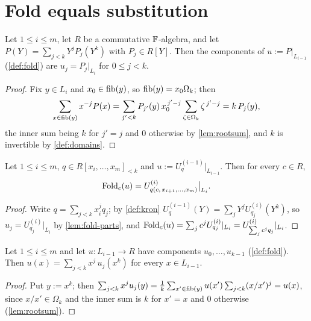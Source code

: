 \section{Fold equals substitution}

\begin{lemma}\label{lem:fold-parts}
Let $1\le i\le m$, let $R$ be a commutative $\mathbb{F}$-algebra, and let
$P(Y)=\sum_{j<k}Y^jP_j(Y^k)$ with $P_j\in R[Y]$. Then the components of $u:=P|_{L_{i-1}}$
(\cref{def:fold}) are $u_j=P_j|_{L_i}$ for $0\le j<k$.
\end{lemma}

\begin{proof}
Fix $y\in L_i$ and $x_0\in\mathrm{fib}(y)$, so $\mathrm{fib}(y)=x_0\Omega_k$; then
\[
\sum_{x\in\mathrm{fib}(y)}x^{-j}P(x)=\sum_{j'<k}P_{j'}(y)\,x_0^{\,j'-j}\sum_{\zeta\in\Omega_k}
\zeta^{\,j'-j}=k\,P_j(y),
\]
the inner sum being $k$ for $j'=j$ and $0$ otherwise by \cref{lem:rootsum}, and $k$ is invertible by
\cref{def:domains}.
\end{proof}

\begin{lemma}\label{lem:fold-sub}
Let $1\le i\le m$, $q\in R[x_i,\dots,x_m]_{<k}$ and $u:=U^{(i-1)}_q|_{L_{i-1}}$. Then for every
$c\in R$,
\[
\mathrm{Fold}_c(u)=U^{(i)}_{q(c,\,x_{i+1},\dots,x_m)}\big|_{L_i}.
\]
\end{lemma}

\begin{proof}
Write $q=\sum_{j<k}x_i^jq_j$; by \cref{def:kron} $U^{(i-1)}_q(Y)=\sum_jY^jU^{(i)}_{q_j}(Y^k)$, so
$u_j=U^{(i)}_{q_j}|_{L_i}$ by \cref{lem:fold-parts}, and
$\mathrm{Fold}_c(u)=\sum_jc^jU^{(i)}_{q_j}|_{L_i}=U^{(i)}_{\sum_jc^jq_j}|_{L_i}$.
\end{proof}

\begin{lemma}[Inversion]\label{lem:fold-invert}
Let $1\le i\le m$ and let $u:L_{i-1}\to R$ have components $u_0,\dots,u_{k-1}$
(\cref{def:fold}). Then $u(x)=\sum_{j<k}x^j\,u_j(x^k)$ for every $x\in L_{i-1}$.
\end{lemma}

\begin{proof}
Put $y:=x^k$; then $\sum_{j<k}x^ju_j(y)=\frac1k\sum_{x'\in\mathrm{fib}(y)}u(x')\sum_{j<k}(x/x')^j=u(x)$,
since $x/x'\in\Omega_k$ and the inner sum is $k$ for $x'=x$ and $0$ otherwise
(\cref{lem:rootsum}).
\end{proof}

